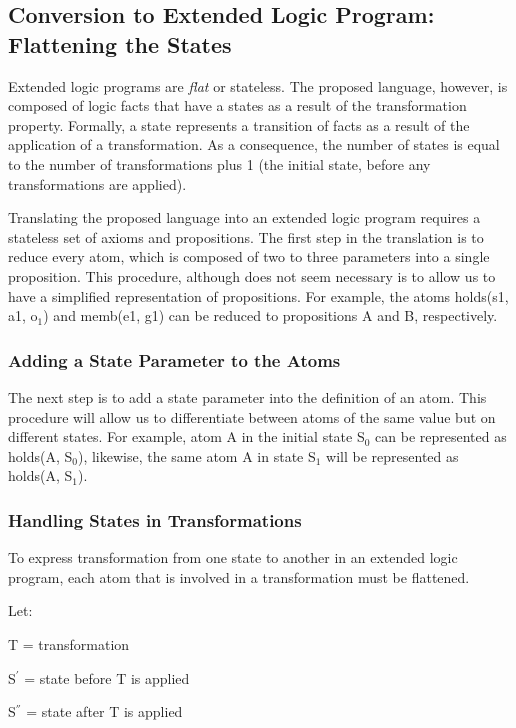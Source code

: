 \documentclass[a4paper]{article}
\begin{document}
    \subsection{Conversion to Extended Logic Program: Flattening the States}

      Extended logic programs are \emph{flat} or stateless. The proposed
      language, however, is composed of logic facts that have a states as
      a result of the transformation property. Formally, a state represents
      a transition of facts as a result of the application of a transformation.
      As a consequence, the number of states is equal to the number of
      transformations plus 1 (the initial state, before any transformations
      are applied).

      Translating the proposed language into an extended logic program requires
      a stateless set of axioms and propositions. The first step in the 
      translation is to reduce every atom, which is composed of two to three
      parameters into a single proposition. This procedure, although does not
      seem necessary is to allow us to have a simplified representation of
      propositions. For example, the atoms holds(s1, a1, o$_{1}$) and memb(e1, g1)
      can be reduced to propositions A and B, respectively.

      \subsubsection{Adding a State Parameter to the Atoms}

        The next step is to add a state parameter into the definition of an
        atom. This procedure will allow us to differentiate between atoms of
        the same value but on different states. For example, atom A in 
        the initial state S$_0$ can be represented as holds(A, S$_0$),
        likewise, the same atom A in state S$_1$ will be represented as
        holds(A, S$_1$).

      \subsubsection{Handling States in Transformations}

        To express transformation from one state to another in an extended
        logic program, each atom that is involved in a transformation must
        be flattened.

        Let:
  
        \begin{list}{}{}
          \item T = transformation
          \item S$^{'}$ = state before T is applied
          \item S$^{''}$ = state after T is applied
        \end{list}
  
\end{document}
